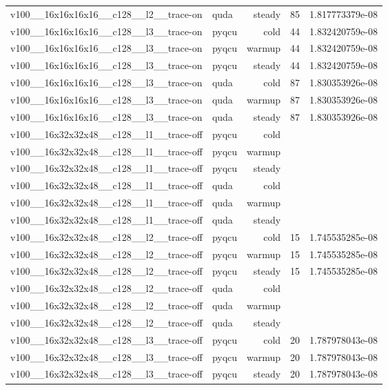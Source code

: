 \begin{table}[htbp]
\begin{tabular}{@{}llrrr@{}}
v100\_\_16x16x16x16\_\_c128\_\_l2\_\_trace-on & quda & steady & 85 & 1.817773379e-08 \\
v100\_\_16x16x16x16\_\_c128\_\_l3\_\_trace-on & pyqcu & cold & 44 & 1.832420759e-08 \\
v100\_\_16x16x16x16\_\_c128\_\_l3\_\_trace-on & pyqcu & warmup & 44 & 1.832420759e-08 \\
v100\_\_16x16x16x16\_\_c128\_\_l3\_\_trace-on & pyqcu & steady & 44 & 1.832420759e-08 \\
v100\_\_16x16x16x16\_\_c128\_\_l3\_\_trace-on & quda & cold & 87 & 1.830353926e-08 \\
v100\_\_16x16x16x16\_\_c128\_\_l3\_\_trace-on & quda & warmup & 87 & 1.830353926e-08 \\
v100\_\_16x16x16x16\_\_c128\_\_l3\_\_trace-on & quda & steady & 87 & 1.830353926e-08 \\
v100\_\_16x32x32x48\_\_c128\_\_l1\_\_trace-off & pyqcu & cold &  &  \\
v100\_\_16x32x32x48\_\_c128\_\_l1\_\_trace-off & pyqcu & warmup &  &  \\
v100\_\_16x32x32x48\_\_c128\_\_l1\_\_trace-off & pyqcu & steady &  &  \\
v100\_\_16x32x32x48\_\_c128\_\_l1\_\_trace-off & quda & cold &  &  \\
v100\_\_16x32x32x48\_\_c128\_\_l1\_\_trace-off & quda & warmup &  &  \\
v100\_\_16x32x32x48\_\_c128\_\_l1\_\_trace-off & quda & steady &  &  \\
v100\_\_16x32x32x48\_\_c128\_\_l2\_\_trace-off & pyqcu & cold & 15 & 1.745535285e-08 \\
v100\_\_16x32x32x48\_\_c128\_\_l2\_\_trace-off & pyqcu & warmup & 15 & 1.745535285e-08 \\
v100\_\_16x32x32x48\_\_c128\_\_l2\_\_trace-off & pyqcu & steady & 15 & 1.745535285e-08 \\
v100\_\_16x32x32x48\_\_c128\_\_l2\_\_trace-off & quda & cold &  &  \\
v100\_\_16x32x32x48\_\_c128\_\_l2\_\_trace-off & quda & warmup &  &  \\
v100\_\_16x32x32x48\_\_c128\_\_l2\_\_trace-off & quda & steady &  &  \\
v100\_\_16x32x32x48\_\_c128\_\_l3\_\_trace-off & pyqcu & cold & 20 & 1.787978043e-08 \\
v100\_\_16x32x32x48\_\_c128\_\_l3\_\_trace-off & pyqcu & warmup & 20 & 1.787978043e-08 \\
v100\_\_16x32x32x48\_\_c128\_\_l3\_\_trace-off & pyqcu & steady & 20 & 1.787978043e-08 \\

\end{tabular}
\end{table}
